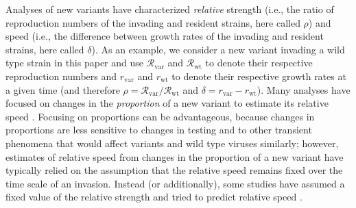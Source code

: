 \documentclass[12pt]{article}
\newcommand{\vvvar}{\mathrm{var}}
\newcommand{\wwwt}{\mathrm{wt}}
\newcommand{\rx}[1]{\ensuremath{{r}_{#1}}\xspace}
\newcommand{\rw}{\rx{\wwwt}}
\newcommand{\rv}{\rx{\vvvar}}
\newcommand{\Rx}[1]{\ensuremath{{\mathcal R}_{#1}}\xspace}
\newcommand{\Rw}{\Rx{\wwwt}}
\newcommand{\Rv}{\Rx{\vvvar}}
\begin{document}
Analyses of new variants have characterized \emph{relative} strength (i.e., the ratio of reproduction numbers of the invading and resident strains, here called $\rho$) and speed (i.e., the difference between growth rates of the invading and resident strains, here called $\delta$).
As an example, we consider a new variant invading a wild type strain in this paper and use $\Rv$ and $\Rw$ to denote their respective reproduction numbers and $\rv$ and $\rw$ to denote their respective growth rates at a given time (and therefore $\rho = \Rv/\Rw$ and $\delta = \rv-\rw$).
Many analyses have focused on changes in the \emph{proportion} of a new variant to estimate its relative speed \citep{switzerland2021variant, davies2021estimated, di2021impact, graham2021changes, leung2021early, volz2021transmission,zhao2021}.
Focusing on proportions can be advantageous, because changes in proportions are less sensitive to changes in testing and to other transient phenomena that would affect variants and wild type viruses
similarly;
however, estimates of relative speed from changes in the proportion of a new variant have typically relied on the assumption that the relative speed remains fixed over the time scale of an invasion.
Instead (or additionally), some studies have assumed a fixed value of the relative strength and tried to predict relative speed \citep{davies2021estimated,di2021impact}.
\end{document}
